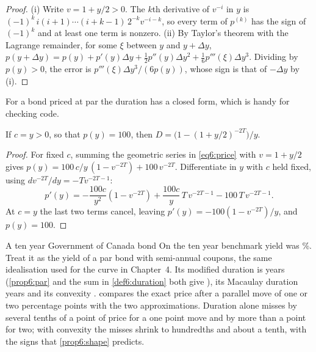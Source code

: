 \begin{chapterrefs}
\begin{proof}
(i) Write $v=1+y/2>0$. The $k$th derivative of $v^{-i}$ in $y$ is
$(-1)^k\,i(i+1)\cdots(i+k-1)\,2^{-k}v^{-i-k}$, so every term of $p^{(k)}$ has the sign of $(-1)^k$ and at
least one term is nonzero. (ii) By Taylor's theorem with the Lagrange remainder, for some $\xi$ between
$y$ and $y+\Delta y$, $p(y+\Delta y)=p(y)+p'(y)\Delta y+\tfrac12p''(y)\Delta y^2+\tfrac16p'''(\xi)\Delta y^3$.
Dividing by $p(y)>0$, the error is $p'''(\xi)\Delta y^3/(6p(y))$, whose sign is that of $-\Delta y$ by (i).
\end{proof}

For a bond priced at par the duration has a closed form, which is handy for checking code.

\begin{proposition}\label{prop6:par}
If $c=y>0$, so that $p(y)=100$, then $D=\bigl(1-(1+y/2)^{-2T}\bigr)/y$.
\end{proposition}

\begin{proof}
For fixed $c$, summing the geometric series in \cref{eq6:price} with $v=1+y/2$ gives
$p(y)=100\,c/y\,(1-v^{-2T})+100\,v^{-2T}$. Differentiate in $y$ with $c$ held fixed, using
$dv^{-2T}/dy=-Tv^{-2T-1}$:
\[
  p'(y)=-\frac{100c}{y^2}(1-v^{-2T})+\frac{100c}{y}\,T\,v^{-2T-1}-100\,T\,v^{-2T-1}.
\]
At $c=y$ the last two terms cancel, leaving $p'(y)=-100(1-v^{-2T})/y$, and $p(y)=100$.
\end{proof}

\begin{example}{A ten year Government of Canada bond}\label{ex6:tenyear}
On \bdDate{} the ten year benchmark yield was \bdY\%. Treat it as the yield of a par bond with
semi-annual coupons, the same idealisation used for the curve in Chapter~4. Its modified duration
is \bdD{} years (\cref{prop6:par} and the sum in \cref{def6:duration} both give \bdDpar), its Macaulay duration \bdMac{} years and its convexity \bdC. 
compares the exact price after a parallel move of one or two percentage points with the two
approximations. Duration alone misses by several tenths of a point of price for a one point move and
by more than a point for two; with convexity the misses shrink to hundredths and about a tenth, with
the signs that \cref{prop6:shape} predicts.
\end{example}


\end{chapterrefs}
